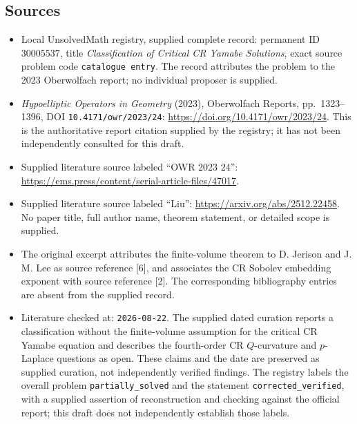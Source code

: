 \documentclass[11pt]{article}
\begin{document}
\subsection{Sources}
\begin{itemize}
\item Local UnsolvedMath registry, supplied complete record: permanent ID \(30005537\), title \emph{Classification of Critical CR Yamabe Solutions}, exact source problem code \texttt{catalogue entry}. The record attributes the problem to the 2023 Oberwolfach report; no individual proposer is supplied.
\item \emph{Hypoelliptic Operators in Geometry} (2023), Oberwolfach Reports, pp.\ 1323--1396, DOI \texttt{10.4171/owr/2023/24}: \url{https://doi.org/10.4171/owr/2023/24}. This is the authoritative report citation supplied by the registry; it has not been independently consulted for this draft.
\item Supplied literature source labeled ``OWR 2023 24'': \url{https://ems.press/content/serial-article-files/47017}.
\item Supplied literature source labeled ``Liu'': \url{https://arxiv.org/abs/2512.22458}. No paper title, full author name, theorem statement, or detailed scope is supplied.
\item The original excerpt attributes the finite-volume theorem to D. Jerison and J. M. Lee as source reference [6], and associates the CR Sobolev embedding exponent with source reference [2]. The corresponding bibliography entries are absent from the supplied record.
\item Literature checked at: \texttt{2026-08-22}. The supplied dated curation reports a classification without the finite-volume assumption for the critical CR Yamabe equation and describes the fourth-order CR \(Q\)-curvature and \(p\)-Laplace questions as open. These claims and the date are preserved as supplied curation, not independently verified findings. The registry labels the overall problem \texttt{partially\_solved} and the statement \texttt{corrected\_verified}, with a supplied assertion of reconstruction and checking against the official report; this draft does not independently establish those labels.
\end{itemize}
\end{document}

